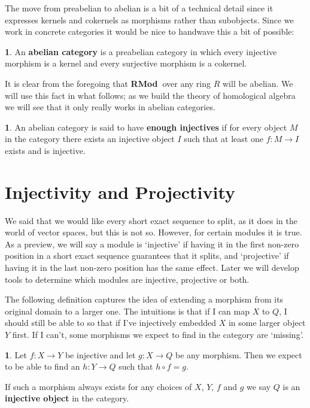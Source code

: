 \documentclass[oneside,english]{amsbook}
\numberwithin{section}{chapter}
\theoremstyle{plain}
\theoremstyle{definition}
\newtheorem{defn}[thm]{\protect\definitionname}
\providecommand{\definitionname}{Definition}
\newcommand{\catname}[1]{{\normalfont\textbf{#1}}}
\newcommand{\RMod}{\catname{RMod\ }}
\begin{document}
			The move from preabelian to abelian is a bit of a technical detail since it expresses kernels and cokernels as morphisms rather than subobjects. Since we work in concrete categories it would be nice to handwave this a bit of possible: 
			
			\begin{defn}
				An \textbf{abelian category} is a preabelian category in which every injective morphism is a kernel and every surjective morphism is a cokernel.
			\end{defn}
			
			It is clear from the foregoing that \RMod over any ring $R$ will be abelian. We will use this fact in what follows; as we build the theory of homological algebra we will see that it only really works in abelian categories.
			
			\begin{defn}
				An abelian category is said to have \textbf{enough injectives} if for every object $M$ in the category there exists an injective object $I$ such that at least one $f:M\to I$ exists and is injective.
			\end{defn}

		\section{Injectivity and Projectivity}
		
			We said that we would like every short exact sequence to split, as it does in the world of vector spaces, but this is not so. However, for certain modules it is true. As a preview, we will say a module is `injective' if having it in the first non-zero position in a short exact sequence guarantees that it splits, and `projective' if having it in the last non-zero position has the same effect. Later we will develop tools to determine which modules are injective, projective or both.
		
			The following definition captures the idea of extending a morphism from its original domain to a larger one. The intuitions is that if I can map $X$ to $Q$, I should still be able to so that if I've injectively embedded $X$ in some larger object $Y$ first. If I can't, some morphisms we expect to find in the category are `missing'.
					
			\begin{defn}
				Let $f:X\to Y$ be injective and let $g:X\to Q$ be any morphism. Then we expect to be able to find an $h:Y\to Q$ such that $h\circ f = g$. 
				\begin{center}
				\end{center}					
				If such a morphism always exists for any choices of $X$, $Y$, $f$ and $g$ we say $Q$ is an \textbf{injective object} in the category. 
			\end{defn}
			
\end{document}
